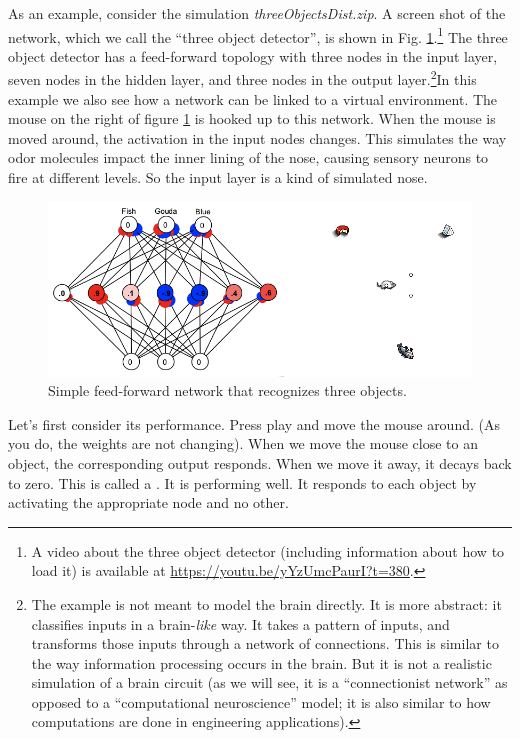 As an example, consider the simulation  {\em threeObjectsDist.zip}.  A screen shot of the network, which we call the ``three object detector'',  is shown in Fig. \ref{3ObjectClassifier}.\footnote{A video about the three object detector (including information about how to load it) is available at \url{https://youtu.be/yYzUmcPaurI?t=380}. } The three object detector has a feed-forward topology with three nodes in the input layer, seven nodes in the hidden layer, and three nodes in the output layer.\footnote{The example is not meant to model the brain directly. It is more abstract:  it classifies inputs in a  brain-\emph{like} way. It takes a pattern of inputs, and transforms those inputs through a network of connections. This is similar to the way information processing occurs in the brain. But it is not a realistic simulation of a brain circuit (as we will see, it is a ``connectionist network'' as opposed to a ``computational neuroscience'' model; it is also similar to how computations are done in engineering applications).}In this example we also see how a network can be linked to a virtual environment. The mouse on the right of figure \ref{3ObjectClassifier} is hooked up to this network. When the mouse is moved around, the activation in the input nodes changes. This simulates the way odor molecules impact the inner lining of the nose, causing sensory neurons to fire at different levels. So the input layer is a kind of simulated nose. 
\begin{figure}[h]
\centering
\includegraphics[scale=.4]{./images/3Node_World.png}
\caption[Simbrain screenshot.]{Simple feed-forward network that recognizes three objects.}
\label{3ObjectClassifier}
\end{figure}

Let's first consider its performance. Press play and move the mouse around. (As you do, the weights are not changing). When we move the mouse close to an object, the corresponding output responds.  When we move it away, it decays back to zero.  This is called a . It is performing well.  It responds to each object by activating the appropriate node and no other.

